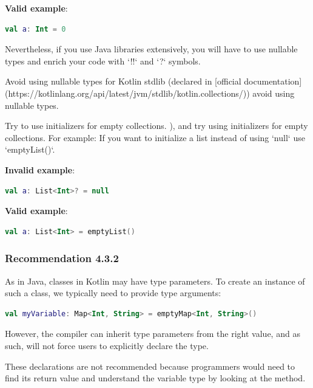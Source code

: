 {{{{\textbf{Valid example}:

\begin{lstlisting}[language=Kotlin]
val a: Int = 0
\end{lstlisting}


Nevertheless, if you use Java libraries extensively, you will have to use nullable types and enrich your code with `!!` and `?` symbols.

Avoid using nullable types for Kotlin stdlib (declared in [official documentation](https://kotlinlang.org/api/latest/jvm/stdlib/kotlin.collections/)) avoid using nullable types.

Try to use initializers for empty collections. ), and try using initializers for empty collections. For example: If you want to initialize a list instead of using `null` use `emptyList()`.



\textbf{Invalid example}:

\begin{lstlisting}[language=Kotlin]
val a: List<Int>? = null
\end{lstlisting}


\textbf{Valid example}:

\begin{lstlisting}[language=Kotlin]
val a: List<Int> = emptyList()
\end{lstlisting}


\subsubsection*{\textbf{Recommendation 4.3.2}}
\leavevmode\newline

As in Java, classes in Kotlin may have type parameters. To create an instance of such a class, we typically need to provide type arguments:



\begin{lstlisting}[language=Kotlin]
val myVariable: Map<Int, String> = emptyMap<Int, String>()
\end{lstlisting}


However, the compiler can inherit type parameters from the right value, and as such, will not force users to explicitly declare the type.

These declarations are not recommended because programmers would need to find its return value and understand the variable type by looking at the method.



}}}}
